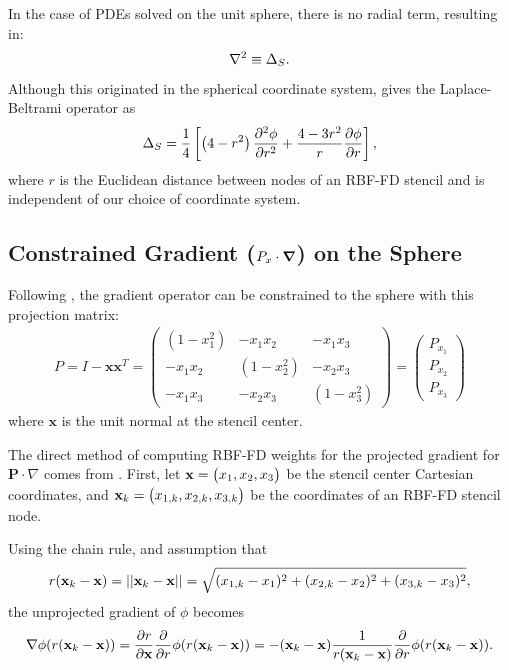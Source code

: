\documentclass[11pt]{report}
\begin{document}
{In the case of PDEs solved on the unit sphere, there is no radial term, resulting in:
\begin{align}
\nabla^2 \equiv \Delta_S .
\end{align}
Although this originated in the spherical coordinate system, \cite{WrightFlyerYuen10} gives the Laplace-Beltrami operator as
\begin{align*} 
\Delta_S = \frac{1}{4} \left[ \left(4-r^2\right) \frac{\partial^2 \phi}{\partial r^2} + \frac{4-3r^2}{r} \frac{\partial \phi}{\partial r} \right],
\end{align*} 
where $r$ is the Euclidean distance between nodes of an RBF-FD stencil and is independent of our choice of coordinate system. 

\subsection{Constrained Gradient ($P_{x} \cdot \grad$) on the Sphere}

Following \cite{FlyerWright09, FlyerLehto11}, the gradient operator can be constrained to the sphere with this projection matrix: 
\begin{align}
P = I - \mathbf{x} \mathbf{x}^T =  \begin{pmatrix} 
(1-x_1^2) & -x_1 x_2 & -x_1 x_3 \\
-x_1 x_2 & (1-x_2^2) & -x_2 x_3 \\ 
-x_1 x_3 & -x_2 x_3 & (1-x_3^2) 
\end{pmatrix} = \begin{pmatrix} P_{x_1} \\ P_{x_2} \\ P_{x_3} \end{pmatrix}
\label{eq:project_gradient}
\end{align}
where $\mathbf{x}$ is the unit normal at the stencil center. 


The direct method of computing RBF-FD weights for the projected gradient for $\mathbf{P} \cdot \nabla $ comes from \cite{FlyerWright09}. First, let $\mathbf{x} = \begin{pmatrix} x_1, x_2, x_3 \end{pmatrix} $ be the stencil center Cartesian coordinates, and $\mathbf{x}_k=\begin{pmatrix} x_{1,k}, x_{2,k}, x_{3,k}\end{pmatrix}$ be the coordinates of an RBF-FD stencil node. 

Using the chain rule, and assumption that 
$$r(\mathbf{x}_k-\mathbf{x})=\left|\left|\mathbf{x}_k-\mathbf{x}\right|\right| = \sqrt{(x_{1,k}-x_1)^2 + (x_{2,k}-x_2)^2 + (x_{3,k}-x_3)^2},$$
 the unprojected gradient of $\phi$ becomes
\begin{align*}
\nabla \phi(r(\mathbf{x}_k - \mathbf{x})) = \frac{\partial r}{\partial \mathbf{x}}  \frac{\partial }{\partial r} \phi(r(\mathbf{x}_k - \mathbf{x})) = - (\mathbf{x}_k - \mathbf{x})\frac{1}{r(\mathbf{x}_k - \mathbf{x})} \frac{\partial }{\partial r} \phi(r(\mathbf{x}_k - \mathbf{x})) .
\end{align*} 

}
\end{document}
